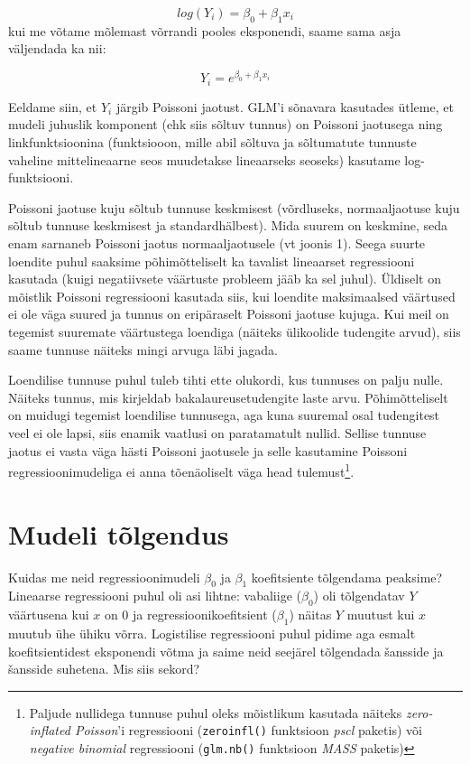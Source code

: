 \documentclass[
]{book}
\begin{document}
\[log(Y_i)=\beta_0+\beta_1 x_i\]
kui me võtame mõlemast võrrandi pooles eksponendi, saame sama asja väljendada ka nii:

\[Y_i = e^{\beta_0+\beta_1 x_i}\]

Eeldame siin, et \(Y_i\) järgib Poissoni jaotust. GLM'i sõnavara kasutades ütleme, et mudeli juhuslik komponent (ehk siis sõltuv tunnus) on Poissoni jaotusega ning linkfunktsioonina (funktsiooon, mille abil sõltuva ja sõltumatute tunnuste vaheline mittelineaarne seos muudetakse lineaarseks seoseks) kasutame log-funktsiooni.

Poissoni jaotuse kuju sõltub tunnuse keskmisest (võrdluseks, normaaljaotuse kuju sõltub tunnuse keskmisest ja standardhälbest). Mida suurem on keskmine, seda enam sarnaneb Poissoni jaotus normaaljaotusele (vt joonis 1). Seega suurte loendite puhul saaksime põhimõtteliselt ka tavalist lineaarset regressiooni kasutada (kuigi negatiivsete väärtuste probleem jääb ka sel juhul). Üldiselt on mõistlik Poissoni regressiooni kasutada siis, kui loendite maksimaalsed väärtused ei ole väga suured ja tunnus on eripäraselt Poissoni jaotuse kujuga. Kui meil on tegemist suuremate väärtustega loendiga (näiteks ülikoolide tudengite arvud), siis saame tunnuse näiteks mingi arvuga läbi jagada.

Loendilise tunnuse puhul tuleb tihti ette olukordi, kus tunnuses on palju nulle. Näiteks tunnus, mis kirjeldab bakalaureusetudengite laste arvu. Põhimõtteliselt on muidugi tegemist loendilise tunnusega, aga kuna suuremal osal tudengitest veel ei ole lapsi, siis enamik vaatlusi on paratamatult nullid. Sellise tunnuse jaotus ei vasta väga hästi Poissoni jaotusele ja selle kasutamine Poissoni regressioonimudeliga ei anna tõenäoliselt väga head tulemust\footnote{Paljude nullidega tunnuse puhul oleks mõistlikum kasutada näiteks \emph{zero-inflated Poisson}'i regressiooni (\texttt{zeroinfl()} funktsioon \emph{pscl} paketis) või \emph{negative binomial} regressiooni (\texttt{glm.nb()} funktsioon \emph{MASS} paketis)}.

\hypertarget{mudeli-tuxf5lgendus-1}{%
\section{Mudeli tõlgendus}\label{mudeli-tuxf5lgendus-1}}

Kuidas me neid regressioonimudeli \(\beta_0\) ja \(\beta_1\) koefitsiente tõlgendama peaksime? Lineaarse regressiooni puhul oli asi lihtne: vabaliige (\(\beta_0\)) oli tõlgendatav \(Y\) väärtusena kui \(x\) on \(0\) ja regressioonikoefitsient (\(\beta_1\)) näitas \(Y\) muutust kui \(x\) muutub ühe ühiku võrra. Logistilise regressiooni puhul pidime aga esmalt koefitsientidest eksponendi võtma ja saime neid seejärel tõlgendada šansside ja šansside suhetena. Mis siis sekord?
\end{document}
